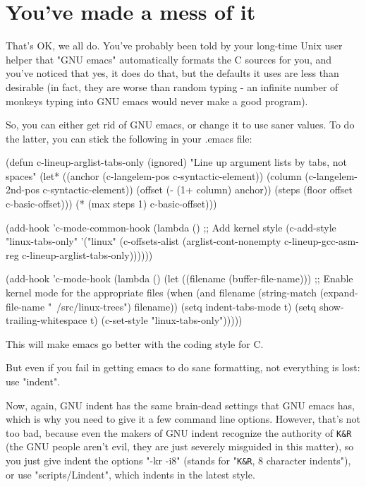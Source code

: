\documentclass[pdftex,12pt, twocol]{article} %
\begin{document}
\section{You've made a mess of it}

That's OK, we all do.  You've probably been told by your long-time Unix
user helper that "GNU emacs" automatically formats the C sources for
you, and you've noticed that yes, it does do that, but the defaults it
uses are less than desirable (in fact, they are worse than random
typing - an infinite number of monkeys typing into GNU emacs would never
make a good program).

So, you can either get rid of GNU emacs, or change it to use saner
values.  To do the latter, you can stick the following in your .emacs file:

(defun c-lineup-arglist-tabs-only (ignored)
  "Line up argument lists by tabs, not spaces"
  (let* ((anchor (c-langelem-pos c-syntactic-element))
         (column (c-langelem-2nd-pos c-syntactic-element))
         (offset (- (1+ column) anchor))
         (steps (floor offset c-basic-offset)))
    (* (max steps 1)
       c-basic-offset)))

(add-hook 'c-mode-common-hook
          (lambda ()
            ;; Add kernel style
            (c-add-style
             "linux-tabs-only"
             '("linux" (c-offsets-alist
                        (arglist-cont-nonempty
                         c-lineup-gcc-asm-reg
                         c-lineup-arglist-tabs-only))))))

(add-hook 'c-mode-hook
          (lambda ()
            (let ((filename (buffer-file-name)))
              ;; Enable kernel mode for the appropriate files
              (when (and filename
                         (string-match (expand-file-name "~/src/linux-trees")
                                       filename))
                (setq indent-tabs-mode t)
                (setq show-trailing-whitespace t)
                (c-set-style "linux-tabs-only")))))

This will make emacs go better with the coding style for C.

But even if you fail in getting emacs to do sane formatting, not
everything is lost: use "indent".

Now, again, GNU indent has the same brain-dead settings that GNU emacs
has, which is why you need to give it a few command line options.
However, that's not too bad, because even the makers of GNU indent
recognize the authority of \verb+K&R+ (the GNU people aren't evil, they are
just severely misguided in this matter), so you just give indent the
options "-kr -i8" (stands for "\verb+K&R+, 8 character indents"), or use
"scripts/Lindent", which indents in the latest style.
\end{document}

